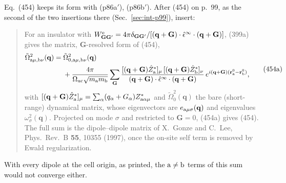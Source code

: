 \documentclass[11pt]{article}
\begin{document}
Eq.~(454) keeps its form with (p86a$'$), (p86b$'$). After (454) on p.~99, as the second of the two
insertions there (Sec.~\ref{sec:int-p99}), insert:
\begin{quote}
For an insulator with
$W^{\rm e}_{\mathbf G\mathbf G'}=4\pi\delta_{\mathbf G\mathbf G'}/[(\mathbf q+\mathbf G)\cdot\hat\epsilon^\infty\cdot
(\mathbf q+\mathbf G)]$, (399a) gives the matrix, $\mathbf G$-resolved form of (454),
\begin{equation*}
\begin{split}
\tilde\Omega^2_{{\rm a}\mu,{\rm b}\nu}(\mathbf q)={}&\tilde\Omega^2_{0,{\rm a}\mu,{\rm b}\nu}(\mathbf q)\\
&+\frac{4\pi}{\Omega_{\rm uc}\sqrt{m_{\rm a}m_{\rm b}}}\sum_{\mathbf G}
\frac{[(\mathbf q+\mathbf G)\hat Z^*_{\rm a}]_\mu\,[(\mathbf q+\mathbf G)\hat Z^*_{\rm b}]_\nu}
{(\mathbf q+\mathbf G)\cdot\hat\epsilon^\infty\cdot(\mathbf q+\mathbf G)}\,
e^{i(\mathbf q+\mathbf G)(\mathbf r^0_{\rm a}-\mathbf r^0_{\rm b})},
\end{split}
\tag{454a}
\end{equation*}
with $[(\mathbf q+\mathbf G)\hat Z^*_{\rm a}]_\mu=\sum_\alpha(q_\alpha+G_\alpha)Z^*_{{\rm a}\alpha\mu}$ and
$\tilde\Omega^2_0(\mathbf q)$ the bare (short-range) dynamical matrix, whose eigenvectors are
$e_{{\rm a}\mu\sigma}(\mathbf q)$ and eigenvalues $\omega^2_\sigma(\mathbf q)$. Projected on mode $\sigma$ and
restricted to $\mathbf G=0$, (454a) gives (454). The full sum is the dipole--dipole matrix of X.~Gonze
and C.~Lee, Phys.\ Rev.\ B \textbf{55}, 10355 (1997), once the on-site self term is removed by Ewald
regularization.
\end{quote}
With every dipole at the cell origin, as printed, the ${\rm a}\neq{\rm b}$ terms of this sum would not
converge either.
\end{document}
